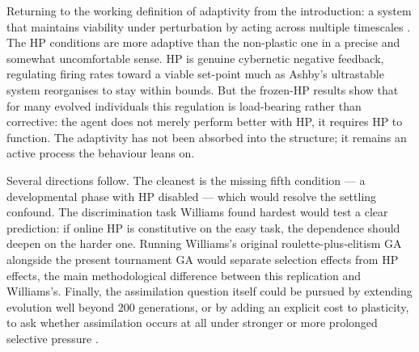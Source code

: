 Returning to the working definition of adaptivity from the introduction: a
system that maintains viability under perturbation by acting across multiple
timescales \parencite{ashby1960, dipaolo2000}. The HP conditions are more
adaptive than the non-plastic one in a precise and somewhat uncomfortable sense.
HP is genuine cybernetic negative feedback, regulating firing rates toward a
viable set-point much as Ashby's ultrastable system reorganises to stay within
bounds. But the frozen-HP results show that for many evolved individuals this
regulation is load-bearing rather than corrective: the agent does not merely
perform better with HP, it requires HP to function. The adaptivity has not been
absorbed into the structure; it remains an active process the behaviour leans
on.

Several directions follow. The cleanest is the missing fifth condition --- a
developmental phase with HP disabled --- which would resolve the settling
confound. The discrimination task Williams found hardest would test a clear
prediction: if online HP is constitutive on the easy task, the dependence should
deepen on the harder one. Running Williams's original roulette-plus-elitism GA
alongside the present tournament GA would separate selection effects from HP
effects, the main methodological difference between this replication and
Williams's. Finally,
the assimilation question itself could be pursued by extending evolution well
beyond $200$ generations, or by adding an explicit cost to plasticity, to ask
whether assimilation occurs at all under stronger or more prolonged selective
pressure \parencite{mayley1996}.
